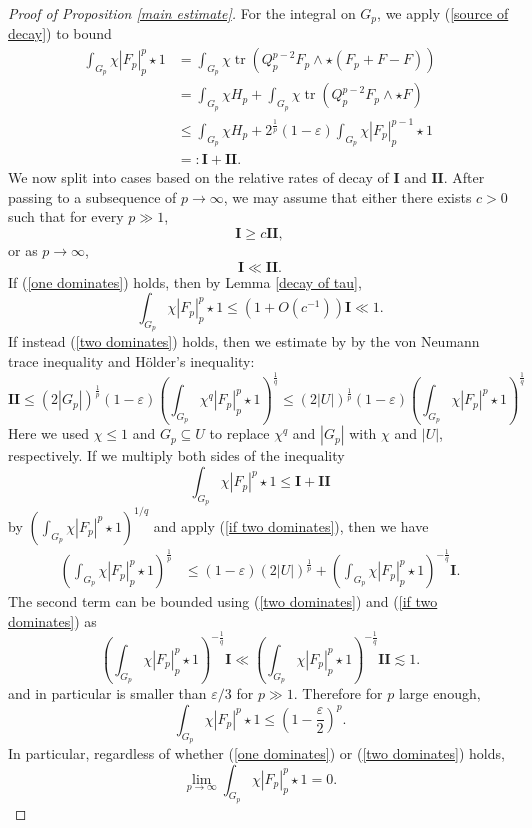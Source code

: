 \documentclass[reqno,11pt]{amsart}
\DeclareMathOperator{\tr}{tr}
\theoremstyle{definition}
\numberwithin{equation}{section}
\begin{document}
\begin{proof}[Proof of Proposition \ref{main estimate}]
For the integral on $G_p$, we apply (\ref{source of decay}) to bound
\begin{align*}
\int_{G_p} \chi |F_p|_p^p \star 1
&= \int_{G_p} \chi \tr(Q_p^{p - 2} F_p \wedge \star (F_p + F - F)) \\
&= \int_{G_p} \chi H_p + \int_{G_p} \chi \tr(Q_p^{p - 2} F_p \wedge \star F) \\
&\leq \int_{G_p} \chi H_p + 2^{\frac{1}{p}} (1 - \varepsilon) \int_{G_p} \chi |F_p|_p^{p - 1} \star 1 \\
&=: \mathbf I + \mathbf{II}.
\end{align*}
We now split into cases based on the relative rates of decay of $\mathbf I$ and $\mathbf{II}$.
After passing to a subsequence of $p \to \infty$, we may assume that either there exists $c > 0$ such that for every $p \gg 1$,
\begin{equation}\label{one dominates}
\mathbf I \geq c \mathbf{II},
\end{equation}
or as $p \to \infty$,
\begin{equation}\label{two dominates}
\mathbf I \ll \mathbf{II}.
\end{equation}
If (\ref{one dominates}) holds, then by Lemma \ref{decay of tau},
$$\int_{G_p} \chi |F_p|_p^p \star 1 \leq (1 + O(c^{-1})) \mathbf I \ll 1.$$
If instead (\ref{two dominates}) holds, then we estimate by by the von Neumann trace inequality and H\"older's inequality:
\begin{equation}\label{if two dominates}
\mathbf{II}
\leq (2|G_p|)^{\frac{1}{p}} (1 - \varepsilon) \left(\int_{G_p} \chi^q |F_p|_p^p \star 1\right)^{\frac{1}{q}}
\leq (2|U|)^{\frac{1}{p}} (1 - \varepsilon) \left(\int_{G_p} \chi |F_p|^p \star 1\right)^{\frac{1}{q}}
\end{equation}
Here we used $\chi \leq 1$ and $G_p \subseteq U$ to replace $\chi^q$ and $|G_p|$ with $\chi$ and $|U|$, respectively.
If we multiply both sides of the inequality
$$\int_{G_p} \chi |F_p|^p \star 1 \leq \mathbf I + \mathbf{II}$$
by $(\int_{G_p} \chi |F_p|^p \star 1)^{1/q}$ and apply (\ref{if two dominates}), then we have
\begin{align*}
\left(\int_{G_p} \chi |F_p|_p^p \star 1\right)^{\frac{1}{p}} 
&\leq (1 - \varepsilon) (2|U|)^{\frac{1}{p}} + \left(\int_{G_p} \chi |F_p|_p^p \star 1\right)^{-\frac{1}{q}} \mathbf I.
\end{align*}
The second term can be bounded using (\ref{two dominates}) and (\ref{if two dominates}) as
$$\left(\int_{G_p} \chi |F_p|_p^p \star 1\right)^{-\frac{1}{q}} \mathbf I \ll \left(\int_{G_p} \chi |F_p|_p^p \star 1\right)^{-\frac{1}{q}} \mathbf{II} \lesssim 1.$$
and in particular is smaller than $\varepsilon/3$ for $p \gg 1$.
Therefore for $p$ large enough,
$$\int_{G_p} \chi |F_p|^p \star 1 \leq \left(1 - \frac{\varepsilon}{2}\right)^p.$$
In particular, regardless of whether (\ref{one dominates}) or (\ref{two dominates}) holds,
\begin{equation}\label{decay on positive}
\lim_{p \to \infty} \int_{G_p} \chi |F_p|_p^p \star 1 = 0.
\end{equation}


\end{proof}
\end{document}
